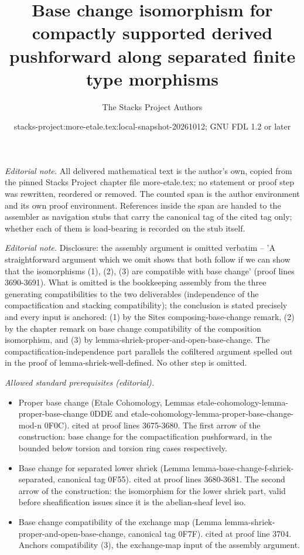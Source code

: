 \documentclass{stacks-project}
\title{Base change isomorphism for compactly supported derived pushforward along separated finite type morphisms}
\author{The Stacks Project Authors}
\date{stacks-project:more-etale.tex:local-snapshot-20261012; GNU FDL 1.2 or later}
\theoremstyle{plain}
\theoremstyle{definition}
\theoremstyle{remark}
\numberwithin{equation}{subsection}
\begin{document}
\maketitle
\setcounter{subsection}{1}
\noindent\textit{Editorial note.} All delivered mathematical text is the author's own, copied from the pinned Stacks Project chapter file more-etale.tex; no statement or proof step was rewritten, reordered or removed. The counted span is the author environment and its own proof environment. References inside the span are handed to the assembler as navigation stubs that carry the canonical tag of the cited tag only; whether each of them is load-bearing is recorded on the stub itself.\par\medskip
\noindent\textit{Editorial note.} Disclosure: the assembly argument is omitted verbatim -- 'A straightforward argument which we omit shows that both follow if we can show that the isomorphisms (1), (2), (3) are compatible with base change' (proof lines 3690-3691). What is omitted is the bookkeeping assembly from the three generating compatibilities to the two deliverables (independence of the compactification and stacking compatibility); the conclusion is stated precisely and every input is anchored: (1) by the Sites composing-base-change remark, (2) by the chapter remark on base change compatibility of the composition isomorphism, and (3) by lemma-shriek-proper-and-open-base-change. The compactification-independence part parallels the cofiltered argument spelled out in the proof of lemma-shriek-well-defined. No other step is omitted.\par\medskip
\noindent\textit{Allowed standard prerequisites (editorial).}\begin{itemize}
\item Proper base change (Etale Cohomology, Lemmas etale-cohomology-lemma-proper-base-change 0DDE and etale-cohomology-lemma-proper-base-change-mod-n 0F0C). cited at proof lines 3675-3680. The first arrow of the construction: base change for the compactification pushforward, in the bounded below torsion and torsion ring cases respectively.
\item Base change for separated lower shriek (Lemma lemma-base-change-f-shriek-separated, canonical tag 0F55). cited at proof lines 3680-3681. The second arrow of the construction: the isomorphism for the lower shriek part, valid before sheafification issues since it is the abelian-sheaf level iso.
\item Base change compatibility of the exchange map (Lemma lemma-shriek-proper-and-open-base-change, canonical tag 0F7F). cited at proof line 3704. Anchors compatibility (3), the exchange-map input of the assembly argument.
\end{itemize}\medskip
\end{document}
